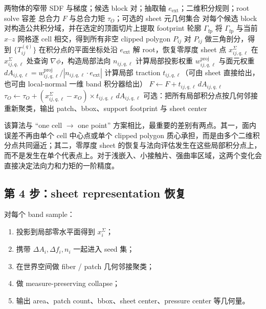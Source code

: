 \documentclass[12pt,a4paper]{ctexart}
\begin{document}
\begin{algorithm}[H]
\caption{$B_{\mathrm{sdf\_quad\_sheet}}$：基于 SDF 轮廓裁剪与局部法向积分的最终推荐离散算法}
\begin{algorithmic}[1]
\Require 两物体的窄带 SDF 与梯度；候选 block 对；抽取轴 $e_{\mathrm{ext}}$；二维积分规则；root solve 容差
\Ensure 总合力 $F$ 与总合力矩 $\tau_O$；可选的 sheet 元几何集合
\State 对每个候选 block 对构造公共积分域，并在选定的顶面切片上提取 footprint 轮廓 $\Gamma_{\mathrm{fp}}$
\State 将 $\Gamma_{\mathrm{fp}}$ 与当前 $x$--$z$ 网格逐 cell 相交，得到所有非空 clipped polygon $P_{ij}$
    \State 对 $P_{ij}$ 做三角剖分，得到 $\{T_{ij}^{(q)}\}$
        \State 在积分点的平面坐标处沿 $e_{\mathrm{ext}}$ 解 root，恢复零厚度 sheet 点 $x_{ij,q,\ell}^{\Sigma}$
        \State 在 $x_{ij,q,\ell}^{\Sigma}$ 处查询 $\nabla\phi$，构造局部法向 $n_{ij,q,\ell}$
        \State 计算局部投影权重 $w^{\mathrm{proj}}_{ij,q,\ell}$ 与面元权重 $dA_{ij,q,\ell}=w^{\mathrm{proj}}_{ij,q,\ell}/|n_{ij,q,\ell}\cdot e_{\mathrm{ext}}|$
        \State 计算局部 traction $t_{ij,q,\ell}$（可由 sheet 直接给出，也可由 local-normal 一维 band 积分器给出）
        \State $F \gets F + t_{ij,q,\ell}\, dA_{ij,q,\ell}$
        \State $\tau_O \gets \tau_O + (x_{ij,q,\ell}^{\Sigma}-x_O)\times t_{ij,q,\ell}\, dA_{ij,q,\ell}$
    \EndFor
\EndFor
\State 可选：把所有局部积分点按几何邻接重新聚类，输出 patch、bbox、support footprint 与 sheet center
\end{algorithmic}
\end{algorithm}

该算法与 ``one cell $\to$ one point'' 方案相比，最重要的差别有两点。其一，面内误差不再由单个 cell 中心点或单个 clipped polygon 质心承担，而是由多个二维积分点共同逼近；其二，零厚度 sheet 的恢复与法向评估发生在这些局部积分点上，而不是发生在单个代表点上。对于浅嵌入、小接触片、强曲率区域，这两个变化会直接决定法向力和力矩的一阶精度。


\subsection{第 4 步：sheet representation 恢复}
对每个 band sample：
\begin{enumerate}
    \item 投影到局部零水平面得到 $x_i^{\Sigma}$；
    \item 携带 $\Delta A_i, \Delta f_i, n_i$ 一起进入 seed 集；
    \item 在世界空间做 fiber / patch 几何邻接聚类；
    \item 做 measure-preserving collapse；
    \item 输出 area、patch count、bbox、sheet center、pressure center 等几何量。
\end{enumerate}
\end{document}
